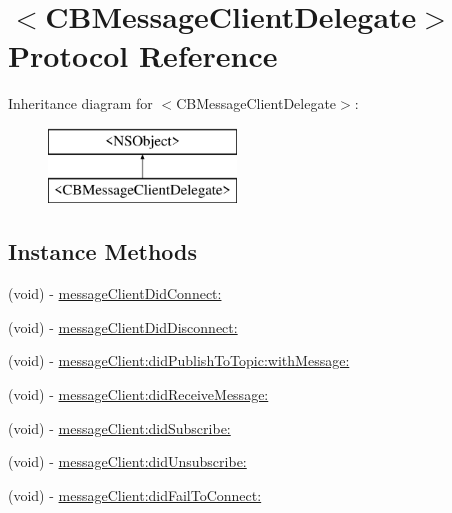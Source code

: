 \hypertarget{protocol_c_b_message_client_delegate-p}{\section{$<$C\+B\+Message\+Client\+Delegate$>$ Protocol Reference}
\label{protocol_c_b_message_client_delegate-p}
}
Inheritance diagram for $<$C\+B\+Message\+Client\+Delegate$>$\+:\begin{figure}[H]
\begin{center}
\leavevmode
\includegraphics[height=2.000000cm]{protocol_c_b_message_client_delegate-p}
\end{center}
\end{figure}
\subsection*{Instance Methods}
\begin{DoxyCompactItemize}
\item 
(void) -\/ \hyperlink{protocol_c_b_message_client_delegate-p_a6693cb7cbf8a409b25b15aa2a3ca8c39}{message\+Client\+Did\+Connect\+:}
\item 
(void) -\/ \hyperlink{protocol_c_b_message_client_delegate-p_a561503ecf3dfabb58045d5ce2a872866}{message\+Client\+Did\+Disconnect\+:}
\item 
(void) -\/ \hyperlink{protocol_c_b_message_client_delegate-p_af0194167f413a3cb0a376c828f1ada34}{message\+Client\+:did\+Publish\+To\+Topic\+:with\+Message\+:}
\item 
(void) -\/ \hyperlink{protocol_c_b_message_client_delegate-p_a7b462fdbc23f08496107696bbe84f580}{message\+Client\+:did\+Receive\+Message\+:}
\item 
(void) -\/ \hyperlink{protocol_c_b_message_client_delegate-p_acdd39cc46ad4e0fcf0b9d5369d358b87}{message\+Client\+:did\+Subscribe\+:}
\item 
(void) -\/ \hyperlink{protocol_c_b_message_client_delegate-p_abf3a4f817617e81ecc7e4c8ae714bc46}{message\+Client\+:did\+Unsubscribe\+:}
\item 
(void) -\/ \hyperlink{protocol_c_b_message_client_delegate-p_ae655148c101c94f59c118b765efa9513}{message\+Client\+:did\+Fail\+To\+Connect\+:}
\end{DoxyCompactItemize}


